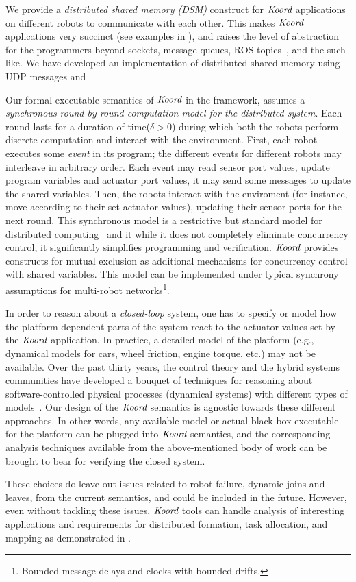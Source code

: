 \begin{noinditem}
\item We provide a {\em distributed shared memory (DSM)\/} construct for $\emph{Koord}$ applications on different robots to communicate with each other. This makes  $\emph{Koord}$ applications very succinct (see examples in ), and raises the level of abstraction for the programmers beyond sockets, message queues, ROS topics~\cite{}, and the such like. We have developed an implementation of distributed shared memory using UDP messages and 
\item Our formal executable semantics of $\emph{Koord}$ in the \K framework, assumes a {\em synchronous round-by-round computation model for the distributed system\/}. Each round lasts for a duration of time($\delta >0$) during which both the robots perform discrete computation and interact with the environment. First, each robot executes some {\em event\/} in its program; the different events for different robots may interleave in arbitrary order. Each event may read sensor port values, update program variables and actuator port values, it may send  some messages to update the shared variables. Then, the robots interact with the enviroment (for instance, move according to their set actuator values), updating their sensor ports for the next round. This synchronous model is a restrictive but standard model for distributed computing~\cite{lynch1996a,attiyawelch} and it while it does not completely eliminate concurrency control, it significantly simplifies programming and verification. $\emph{Koord}$ provides constructs for mutual exclusion as additional mechanisms for concurrency control with shared variables. This model can be implemented under typical synchrony assumptions for multi-robot networks\footnote{Bounded message delays and clocks with bounded drifts.}.
\item In order to reason about a {\em closed-loop\/} system,  one has to specify or model how the platform-dependent parts of the system react to the actuator values set by the $\emph{Koord}$ application. In practice, a detailed model of the platform (e.g., dynamical models for cars, wheel friction, engine torque, etc.) may not be available. Over the past thirty years, the control theory and the hybrid systems communities have developed a bouquet of techniques for reasoning about software-controlled physical processes (dynamical systems) with different types of models~\cite{alurbook, platzerbook,seshiabook}. Our design of the  $\emph{Koord}$ semantics is agnostic towards these different approaches. In other words, any available model or actual black-box executable for the platform can be plugged into $\emph{Koord}$ semantics, and the corresponding analysis techniques available from the above-mentioned body of work can be brought to bear for verifying the closed system.
\end{noinditem}
These choices do leave out issues related to robot failure,  dynamic joins and leaves, from the current semantics, and could be included in the future. However, even without tackling these issues, $\emph{Koord}$ tools can handle analysis of interesting applications and requirements for distributed formation, task allocation, and mapping as demonstrated in .

